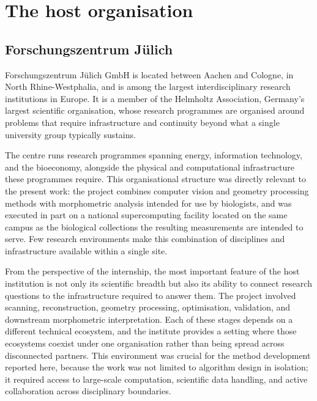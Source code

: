 \chapter{The host organisation}
\label{ch:host}

\section{Forschungszentrum Jülich}

Forschungszentrum Jülich GmbH is located between Aachen and Cologne, in North
Rhine-Westphalia, and is among the largest interdisciplinary research
institutions in Europe. It is a member of the Helmholtz Association, Germany's
largest scientific organisation, whose research programmes are organised
around problems that require infrastructure and continuity beyond what a
single university group typically sustains.

The centre runs research programmes spanning energy, information technology,
and the bioeconomy, alongside the physical and computational infrastructure
these programmes require. This organisational structure was directly relevant
to the present work: the project combines computer vision and geometry
processing methods with morphometric analysis intended for use by biologists,
and was executed in part on a national supercomputing facility located on the
same campus as the biological collections the resulting measurements are
intended to serve. Few research environments make this combination of
disciplines and infrastructure available within a single site.

From the perspective of the internship, the most important feature of the host
institution is not only its scientific breadth but also its ability to connect
research questions to the infrastructure required to answer them. The project
involved scanning, reconstruction, geometry processing, optimisation,
validation, and downstream morphometric interpretation. Each of these stages
depends on a different technical ecosystem, and the institute provides a setting
where those ecosystems coexist under one organisation rather than being spread
across disconnected partners. This environment was crucial for the method
development reported here, because the work was not limited to algorithm design
in isolation; it required access to large-scale computation, scientific data
handling, and active collaboration across disciplinary boundaries.

